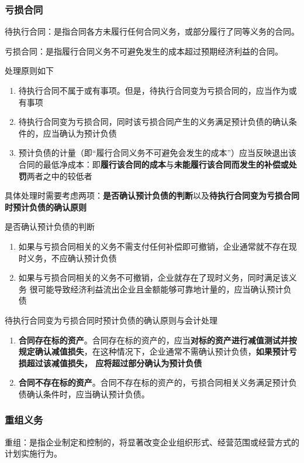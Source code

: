 \documentclass[UTF8,12pt]{ctexart}
\numberwithin{equation}{section} %
\numberwithin{figure}{section}
\numberwithin{table}{section}
\begin{document}
	
	\subsubsection{亏损合同}
	待执行合同：是指合同各方未履行任何合同义务，或部分履行了同等义务的合同。
	
	亏损合同：是指履行合同义务不可避免发生的成本超过预期经济利益的合同。
	
	处理原则如下
	\begin{enumerate}
		\item 待执行合同不属于或有事项。但是，待执行合同变为亏损合同的，应当作为或有事项
		
		\item 待执行合同变为亏损合同，同时该亏损合同产生的义务满足预计负债的确认条件的，应当确认为预计负债
		
		\item 预计负债的计量（即“履行合同义务不可避免会发生的成本”）应当反映退出该合同的最低净成本：即\textbf{履行该合同的成本}与\textbf{未能履行该合同而发生的补偿或处罚}两者之中的较低者
	\end{enumerate}

	具体处理时需要考虑两项：\textbf{是否确认预计负债的判断}以及\textbf{待执行合同变为亏损合同时预计负债的确认原则}
	
	是否确认预计负债的判断
	\begin{enumerate}
		\item 如果与亏损合同相关的义务不需支付任何补偿即可撤销，企业通常就不存在现时义务，不应确认预计负债
		
		\item 如果与亏损合同相关的义务不可撤销，企业就存在了现时义务，同时满足该义务  很可能导致经济利益流出企业且金额能够可靠地计量的，应当确认预计负债
	\end{enumerate}
	
	待执行合同变为亏损合同时预计负债的确认原则与会计处理
	\begin{enumerate}
		\item \textbf{合同存在标的资产}。合同存在标的资产的，应当\textbf{对标的资产进行减值测试并按规定确认减值损失}，在这种情况下，企业通常不需确认预计负债，\textbf{如果预计亏损超过该减值损失，  应将超过部分确认为预计负债}
		
		\item \textbf{合同不存在标的资产}。合同不存在标的资产的，亏损合同相关义务满足预计负债确认条件时，应当确认预计负债。
	\end{enumerate}
	
	\subsubsection{重组义务}
	重组：是指企业制定和控制的，将显著改变企业组织形式、经营范围或经营方式的计划实施行为。
	
\end{document}
